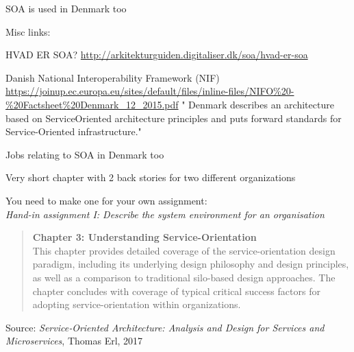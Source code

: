 \documentclass[Screen16to9,17pt]{foils}
\begin{document}

\begin{list2}
\item SOA is used in Denmark too
\item Misc links:
\item HVAD ER SOA? \url{http://arkitekturguiden.digitaliser.dk/soa/hvad-er-soa}
\item  Danish National Interoperability Framework (NIF)\\
\url{https://joinup.ec.europa.eu/sites/default/files/inline-files/NIFO%20-%20Factsheet%20Denmark_12_2015.pdf}
" Denmark describes an architecture
 based on ServiceOriented architecture principles and puts forward standards for Service-Oriented infrastructure."

\item Jobs relating to SOA in Denmark too
\end{list2}




\begin{list2}
\item Very short chapter with 2 back stories for two different organizations
\item You need to make one for your own assignment:\\
\emph{Hand-in assignment I: Describe the system environment for an organisation}
\end{list2}




\begin{quote}
{\bf Chapter 3: Understanding Service-Orientation}\\
This chapter provides detailed coverage of the service-orientation design paradigm, including its underlying design philosophy and design principles, as well as a comparison to traditional silo-based design approaches. The chapter concludes with coverage of typical critical success factors for adopting service-orientation within organizations.
\end{quote}
Source: \emph{Service‑Oriented Architecture: Analysis and Design for Services and Microservices}, Thomas Erl, 2017




\end{document}
